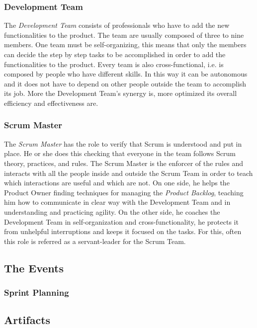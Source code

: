 			\subsubsection{Development Team}
			The \emph{Development Team} consists of professionals who have to add the new functionalities to the product. The team are usually composed of three to nine members. One team must be self-organizing, this means that only the members can decide the step by step tasks to be accomplished in order to add the functionalities to the product. Every team is also cross-functional, i.e. is composed by people who have different skills. In this way it can be autonomous and it does not have to depend on other people outside the team to accomplish its job. More the Development Team's synergy is, more optimized its overall efficiency and effectiveness are.
 
			\subsubsection{Scrum Master}
			The \emph{Scrum Master} has the role to verify that Scrum is understood and put in place. He or she does this checking that everyone in the team follows Scrum theory, practices, and rules. 
			The Scrum Master is the enforcer of the rules and interacts with all the people inside and outside the Scrum Team in order to teach which interactions are useful and which are not.
			On one side, he helps the Product Owner finding techniques for managing the \emph{Product Backlog}, teaching him how to communicate in clear way with the Development Team and in understanding and practicing agility. On the other side, he coaches the Development Team in self-organization and cross-functionality, he protects it from unhelpful interruptions and keeps it focused on the tasks. 
			For this, often this role is referred as a servant-leader for the Scrum Team.


		\subsection{The Events}	
			\subsubsection{Sprint Planning}

		
		\subsection{Artifacts}

